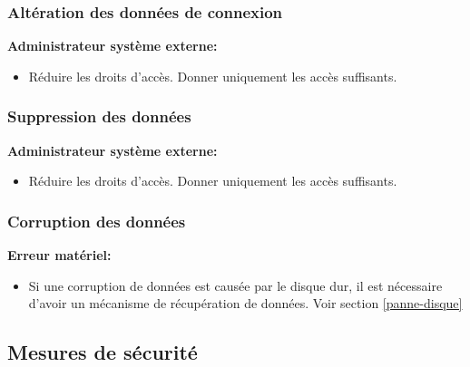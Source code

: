 \documentclass[12pt]{article}
\begin{document}
\subsubsection{Altération des données de connexion}
\hspace{16pt}\textbf{Administrateur système externe:}
\justify
\begin{itemize}
	\item Réduire les droits d'accès. Donner uniquement les accès suffisants.
\end{itemize}


\subsubsection{Suppression des données}
\justify
\hspace{16pt}\textbf{Administrateur système externe:}
\begin{itemize}
	\item Réduire les droits d'accès. Donner uniquement les accès suffisants.
\end{itemize}

\subsubsection{Corruption des données}
\hspace{16pt}\textbf{Erreur matériel:} 
\justify
\begin{itemize}
	\item Si une corruption de données est causée par le disque dur, il est nécessaire d'avoir un mécanisme de récupération de données. Voir section \ref{panne-disque}
\end{itemize}

\subsection{Mesures de sécurité}
\end{document}
